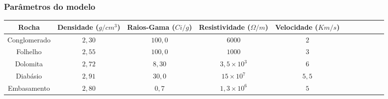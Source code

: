\documentclass[10pt]{beamer} %
\begin{document}

\begin{frame}
	\frametitle{Parâmetros do modelo}
	\begin{scriptsize}
		\begin{table}[H]
			\centering
			\label{parametros}
			\begin{tabular}{@{}ccccccccccc@{}}
				\toprule
				Rocha        & Densidade ($g/cm^{3}$) & Raios-Gama ($Ci/g$) & Resistividade ($\Omega/m$)&  Velocidade ($Km/s$) &\\ \midrule
				Conglomerado &       $2,30$ 		  &       $100,0$       &           $6000$           &			$2$   		   	&\\
				Folhelho 	 &       $2,55$           &       $100,0$       &           $1000$           &     		$3$		 &\\
				Dolomita     &       $2,72$           &       $8,30$        &           $3,5 \times 10^{3}$           &  	$6$    			 &\\
				Diabásio     &       $2,91$           &       $30,0$        &           $15 \times 10^{7}$           &      $5,5$				 &\\
				Embasamento  &       $2,80$           &       $0,7$         &           $1,3 \times 10^{6}$           & 		$5$		     &\\ \bottomrule
			\end{tabular}
		\end{table}
	\end{scriptsize}
	
\end{frame}
\end{document}
